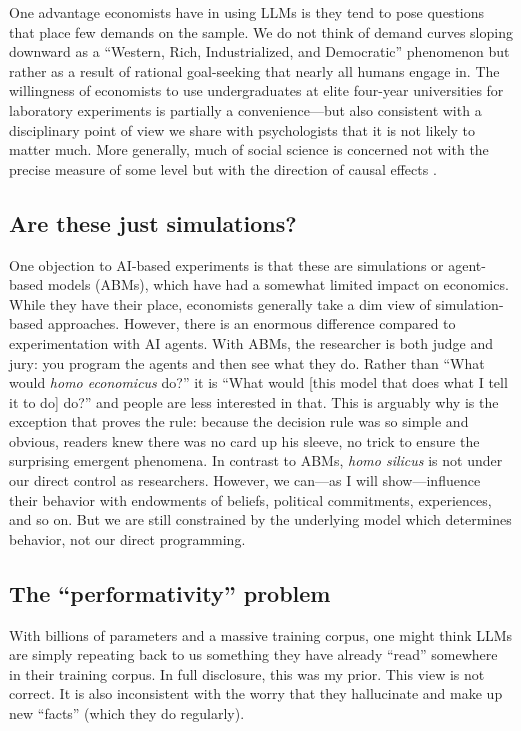 \documentclass[11pt]{article}
\begin{document}
One advantage economists have in using LLMs is they tend to pose questions that place few demands on the sample.
We do not think of demand curves sloping downward as a ``Western, Rich, Industrialized, and Democratic'' phenomenon but rather as a result of rational goal-seeking that nearly all humans engage in. 
The willingness of economists to use undergraduates at elite four-year universities for laboratory experiments is partially a convenience---but also consistent with a disciplinary point of view we share with psychologists that it is not likely to matter much. 
More generally, much of social science is concerned not with the precise measure of some level but with the direction of causal effects \citep{horton2011online}.

\subsection{Are these just simulations?} 
One objection to AI-based experiments is that these are simulations or agent-based models (ABMs), which have had a somewhat limited impact on economics.
While they have their place, economists generally take a dim view of simulation-based approaches.
However, there is an enormous difference compared to experimentation with AI agents.
With ABMs, the researcher is both judge and jury: you program the agents and then see what they do.
Rather than ``What would \emph{homo economicus} do?'' it is ``What would [this model that does what I tell it to do] do?'' and people are less interested in that. 
This is arguably why \cite{schelling1971dynamic} is the exception that proves the rule: because the decision rule was so simple and obvious, readers knew there was no card up his sleeve, no trick to ensure the surprising emergent phenomena.
In contrast to ABMs, \emph{homo silicus} is not under our direct control as researchers. However, we can---as I will show---influence their behavior with endowments of beliefs, political commitments, experiences, and so on.
But we are still constrained by the underlying model which determines behavior, not our direct programming.

\subsection{The ``performativity'' problem}
With billions of parameters and a massive training corpus, one might think LLMs are simply repeating back to us something they have already ``read'' somewhere in their training corpus.
In full disclosure, this was my prior. 
This view is not correct. 
It is also inconsistent with the worry that they hallucinate and make up new ``facts'' (which they do regularly).
\end{document}
